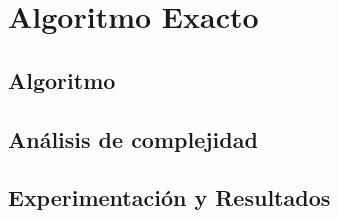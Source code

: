 \section{Algoritmo Exacto}

\subsection{Algoritmo}

\subsection{Análisis de complejidad}

\subsection{Experimentación y Resultados}
